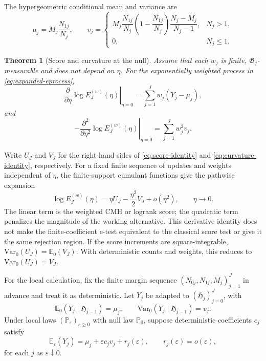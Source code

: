 \documentclass[12pt]{article}
\newtheorem{theorem}{Theorem}[section]
\theoremstyle{definition}
\theoremstyle{remark}
\begin{document}
The hypergeometric conditional mean and variance are
\[
 \mu_j=M_j\frac{N_{1j}}{N_j},\qquad
 v_j=\begin{cases}
 M_j\dfrac{N_{1j}}{N_j}\left(1-\dfrac{N_{1j}}{N_j}\right)
 \dfrac{N_j-M_j}{N_j-1},&N_j>1,\\[6pt]
 0,&N_j\leq1.
 \end{cases}
\]
\begin{theorem}[Score and curvature at the null]
\label{thm:score}
Assume that each $w_j$ is finite, $\mathfrak G_j$-measurable and does not depend on $\eta$. For the exponentially weighted process in \eqref{eq:expanded-eprocess},
\begin{equation}
 \left.\frac{\partial}{\partial\eta}\log E_J^{(w)}(\eta)\right|_{\eta=0}
 =\sum_{j=1}^J w_j(Y_j-\mu_j),
 \label{eq:score-identity}
\end{equation}
and
\begin{equation}
 -\left.\frac{\partial^2}{\partial\eta^2}\log E_J^{(w)}(\eta)\right|_{\eta=0}
 =\sum_{j=1}^J w_j^2v_j.
 \label{eq:curvature-identity}
\end{equation}
\end{theorem}
Write $U_J$ and $V_J$ for the right-hand sides of \eqref{eq:score-identity} and \eqref{eq:curvature-identity}, respectively. For a fixed finite sequence of updates and weights independent of $\eta$, the finite-support cumulant functions give the pathwise expansion
\begin{equation}
 \log E_J^{(w)}(\eta)=\eta U_J-\frac{\eta^2}{2}V_J+o(\eta^2),
 \qquad \eta\to0.
 \label{eq:fixed-sequence-log-expansion}
\end{equation}
The linear term is the weighted CMH or logrank score; the quadratic term penalizes the magnitude of the working alternative. This derivative identity does not make the finite-coefficient e-test equivalent to the classical score test or give it the same rejection region. If the score increments are square-integrable, $\mathrm{Var}_0(U_J)=\mathbb E_0(V_J)$. With deterministic counts and weights, this reduces to $\mathrm{Var}_0(U_J)=V_J$.

For the local calculation, fix the finite margin sequence $(N_{0j},N_{1j},M_j)_{j=1}^J$ in advance and treat it as deterministic. Let $Y_j$ be adapted to $(\mathfrak H_j)_{j=0}^J$, with
\[
 \mathbb E_0(Y_j\mid\mathfrak H_{j-1})=\mu_j,
 \qquad \mathrm{Var}_0(Y_j\mid\mathfrak H_{j-1})=v_j.
\]
Under local laws $(\mathbb P_\varepsilon)_{\varepsilon\geq0}$ with null law $\mathbb P_0$, suppose deterministic coefficients $c_j$ satisfy
\begin{equation}
 \mathbb E_\varepsilon(Y_j)=\mu_j+\varepsilon c_jv_j+r_j(\varepsilon),
 \qquad r_j(\varepsilon)=o(\varepsilon),
 \label{eq:main-local-shift}
\end{equation}
for each $j$ as $\varepsilon\downarrow0$.
\end{document}
